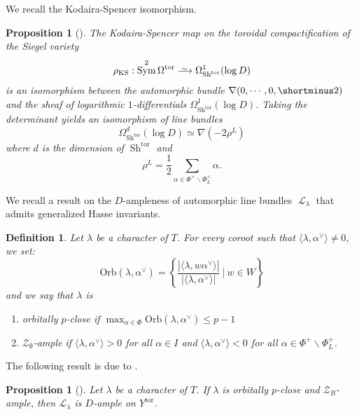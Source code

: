 \documentclass[11pt]{amsart}
\numberwithin{subsection}{section}
\numberwithin{figure}{section}
\numberwithin{table}{section}
\theoremstyle{1}
\newtheorem{proposition}[theorem]{Proposition}
\newtheorem{definition}[theorem]{Definition}
\theoremstyle{2}
\DeclareMathOperator{\Sh}{Sh}
\DeclareMathOperator{\Sym}{Sym}
\DeclareMathOperator{\tor}{tor}
\DeclareMathOperator{\Lc}{\mathcal{L}}
\newcommand{\DistTo}{\xrightarrow{
   \,\smash{\raisebox{-0.65ex}{\ensuremath{\scriptstyle\sim}}}\,}}
\begin{document}
We recall the Kodaira-Spencer isomorphism. 
\begin{proposition}[{\cite[Chap. 3, sect. 9]{MR1083353}}]\label{prop19_sieg}
The Kodaira-Spencer map on the toroidal compactification of the Siegel variety
\begin{equation*}
\rho_{\text{KS}} : \Sym^2 \Omega^{\tor} \DistTo \Omega^1_{\Sh^{\tor}}(\log D)
\end{equation*}
is an isomorphism between the automorphic bundle $\nabla(0, \cdots, 0,\shortminus 2)$ and the sheaf of logarithmic $1$-differentials $\Omega^1_{\Sh^{\tor}}(\log D)$. Taking the determinant yields an isomorphism of line bundles
\begin{equation*}
\Omega^d_{\Sh^{\tor}}(\log D) \simeq \nabla({-2\rho^L})
\end{equation*} 
where $d$ is the dimension of $\Sh^{\tor}$ and
\begin{equation*}
\rho^L = \frac{1}{2} \sum_{\alpha \in \Phi^{+} \backslash \Phi_L^{+}} \alpha.
\end{equation*}
\end{proposition}
We recall a result on the $D$-ampleness of automorphic line bundles $\Lc_{\lambda}$ that admits generalized Hasse invariants.
\begin{definition}
Let $\lambda$ be a character of $T$. For every coroot such that $\langle \lambda,\alpha^{\vee}\rangle \neq 0$, we set:
\begin{equation*}
\text{Orb}(\lambda,\alpha^{\vee}) = \left\{ \frac{ | \langle \lambda,w\alpha^{\vee}\rangle |}{|\langle \lambda,\alpha^{\vee} \rangle | } \ | \ w \in W \right\}
\end{equation*}
and we say that $\lambda$ is 
\begin{enumerate}
\item orbitally $p$-close if $\max_{\alpha \in \Phi} \text{Orb}(\lambda,\alpha^{\vee}) \leq p-1$
\item $\mathcal{Z}_{\emptyset}$-ample if $\langle \lambda, \alpha^{\vee}\rangle >0$ for all $\alpha \in I$ and $\langle \lambda, \alpha^{\vee}\rangle <0$ for all $\alpha \in \Phi^+ \backslash \Phi^+_L$.
\end{enumerate}
\end{definition}
\vspace*{0.2cm}
The following result is due to \cite{StrohPrep}.
\begin{proposition}[{\cite[Theorem 5.11]{alexandre2022vanishing}}]\label{prop_automorphic_line}
Let $\lambda$ be a character of $T$. If $\lambda$ is orbitally $p$-close and $\mathcal{Z}_B$-ample, then $\mathcal{L}_{\lambda}$ is $D$-ample on $Y^{\tor}$.
\end{proposition}
\end{document}
